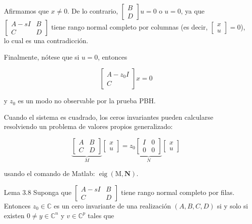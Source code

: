 \documentclass[11pt]{article}
\begin{document}
Afirmamos que $x \neq 0$. De lo contrario, $\left[\begin{array}{l}B \\ D\end{array}\right] u=0$ o $u=0$, ya que $\left[\begin{array}{cc}A-s I & B \\ C & D\end{array}\right]$ tiene rango normal completo por columnas (es decir, $\left[\begin{array}{l}x \\ u\end{array}\right]=0$), lo cual es una contradicción.

Finalmente, nótese que si $u=0$, entonces

$$
\left[\begin{array}{c}
A-z_{0} I \\
C
\end{array}\right] x=0
$$

y $z_{0}$ es un modo no observable por la prueba PBH.

Cuando el sistema es cuadrado, los ceros invariantes pueden calcularse resolviendo un problema de valores propios generalizado:

$$
\underbrace{\left[\begin{array}{ll}
A & B \\
C & D
\end{array}\right]}_{M}\left[\begin{array}{l}
x \\
u
\end{array}\right]=z_{0} \underbrace{\left[\begin{array}{ll}
I & 0 \\
0 & 0
\end{array}\right]}_{N}\left[\begin{array}{l}
x \\
u
\end{array}\right]
$$

usando el comando de Matlab: $\operatorname{eig}(\mathrm{M}, \mathbf{N})$.

Lema 3.8 Suponga que $\left[\begin{array}{cc}A-s I & B \\ C & D\end{array}\right]$ tiene rango normal completo por filas. Entonces $z_{0} \in \mathbb{C}$ es un cero invariante de una realización $(A, B, C, D)$ si y solo si existen $0 \neq y \in \mathbb{C}^{n}$ y $v \in \mathbb{C}^{p}$ tales que
\end{document}
